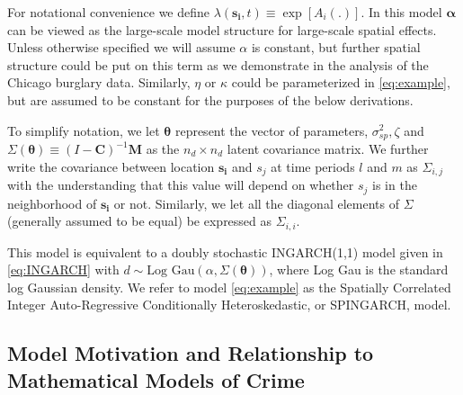 \documentclass[11pt]{isuthesis}
\begin{document}
For notational convenience we define $\lambda(\boldsymbol{s_i},t)\equiv\exp \left[ A_i(.) \right]$. In this model $\boldsymbol{\alpha}$ can be viewed as the large-scale model structure for large-scale spatial effects.  Unless otherwise specified we will assume $\alpha$ is constant, but further spatial structure could be put on this term as we demonstrate in the analysis of the Chicago burglary data.  Similarly, $\eta$ or $\kappa$ could be parameterized in \eqref{eq:example}, but are assumed to be constant for the purposes of the below derivations.

To simplify notation, we let $\boldsymbol{\theta}$ represent the vector of parameters, $\sigma_{sp}^2,\zeta$ and $\Sigma(\boldsymbol{\theta}) \equiv (I-\boldsymbol{C})^{-1}\boldsymbol{M}$ as the $n_{d} \times n_{d}$ latent covariance matrix.  We further write the covariance between location $\boldsymbol{s_i}$ and $s_j$ at time periods $l$ and $m$ as $\Sigma_{i,j}$ with the understanding that this value will depend on whether $s_j$ is in the neighborhood of $\boldsymbol{s_i}$ or not.  Similarly, we let all the diagonal elements of $\Sigma$ (generally assumed to be equal) be expressed as $\Sigma_{i,i}$. 

This model is equivalent to a doubly stochastic INGARCH(1,1) model given in \eqref{eq:INGARCH} with $d\sim \mbox{Log Gau}(\alpha,\Sigma(\boldsymbol{\theta}))$, where Log Gau is the standard log Gaussian density.  We refer to model \eqref{eq:example} as the Spatially Correlated Integer Auto-Regressive Conditionally Heteroskedastic, or SPINGARCH, model.  


\subsection{Model Motivation and Relationship to Mathematical Models of Crime}
\end{document}
